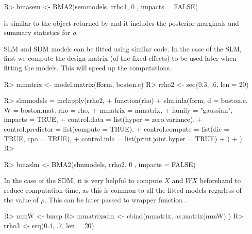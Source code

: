 \documentclass[article]{jss}
\begin{document}
\begin{Schunk}
\begin{Sinput}
R> bmasem <- BMA2(semmodels, rrho1, 0 , impacts = FALSE)
\end{Sinput}
\end{Schunk}

 is similar to the object returned by  and it
includes the posterior marginals and summary statistics for $\rho$.

SLM and SDM models can be fitted using similar code. In the case of
the SLM, first we compute the design matrix (of the fixed effects) 
to be used later when fitting the models. This will speed up the 
computations.

\begin{Schunk}
\begin{Sinput}
R> mmatrix <- model.matrix(fform, boston.c)
R> rrho2 <- seq(0.3, .6, len = 20)
\end{Sinput}
\end{Schunk}

\begin{Schunk}
\begin{Sinput}
R> slmmodels = mclapply(rrho2,
+          function(rho) {
+                  slm.inla(form, d = boston.c, W = boston.mat, rho = rho, 
+  			mmatrix = mmatrix,
+                          family = "gaussian", impacts = TRUE,
+                          control.data = list(hyper = zero.variance),
+                          control.predictor = list(compute = TRUE),
+                          control.compute = list(dic = TRUE, cpo = TRUE),
+                          control.inla = list(print.joint.hyper = TRUE)
+                  )
+          })
R> 
\end{Sinput}
\end{Schunk}

\begin{Schunk}
\begin{Sinput}
R> bmaslm <- BMA2(slmmodels, rrho2, 0 , impacts = FALSE)
\end{Sinput}
\end{Schunk}

In the case of the SDM, it is very helpful to compute $X$ and $WX$ beforehand
to reduce computation time, as this is common to all the fitted models
regarless of the value of $\rho$. This can be later passed to wrapper function
.

\begin{Schunk}
\begin{Sinput}
R> mmW <- bmsp %*% mmatrix[,-1]#Remove intercept
R> mmatrixsdm <- cbind(mmatrix, as.matrix(mmW) )
R> rrho3 <- seq(0.4, .7, len = 20)
\end{Sinput}
\end{Schunk}
\end{document}
